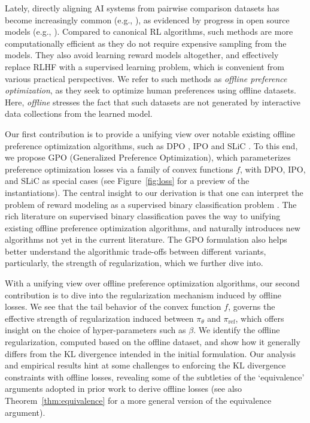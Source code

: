 Lately, directly aligning AI systems from pairwise comparison datasets has become increasingly common (e.g., \citealp{rafailov2023direct,azar2023general,zhao2023SLiC}), as evidenced by progress in open source models (e.g., \citealp{jiang2024mixtral}). Compared to canonical RL algorithms, such methods are more computationally efficient as they do not require expensive sampling from the models. They also avoid learning reward models altogether, and effectively replace RLHF with a supervised learning problem, which is convenient from various practical perspectives. We refer to such methods as \emph{offline preference optimization}, as they seek to optimize human preferences using offline datasets. Here, \emph{offline} stresses the fact that such datasets are not generated by interactive data collections from the learned model.

Our first contribution is to provide a unifying view over notable existing offline preference optimization algorithms, such as DPO \citep{rafailov2023direct}, IPO \citep{azar2023general} and SLiC \citep{zhao2023SLiC}. To this end, we propose GPO (Generalized Preference Optimization),
which parameterizes preference optimization losses via a family of convex functions $f$, with DPO, IPO, and SLiC as special cases (see Figure~\ref{fig:loss} for a preview of the instantiations). The central insight to our derivation is that one can interpret the problem of reward modeling as a supervised binary classification problem \citep{hastie2009elements}. The rich literature on supervised binary classification paves the way to unifying existing offline preference optimization algorithms, and naturally introduces new algorithms not yet in the current literature. The GPO formulation also helps better understand the algorithmic trade-offs between different variants, particularly, the strength of regularization, which we further dive into.

With a unifying view over offline preference optimization algorithms, our second contribution is to dive into the regularization mechanism induced by offline losses. We see that the tail behavior of the convex function $f$, governs the effective strength of regularization induced between $\pi_\theta$ and $\pi_\text{ref}$, which offers insight on the choice of hyper-parameters such as $\beta$. We identify the offline regularization, computed based on the offline dataset, and show how it generally differs from the KL divergence intended in the initial formulation. Our analysis and empirical results hint at some challenges to enforcing the KL divergence constraints with offline losses, revealing some of the subtleties of the `equivalence' arguments adopted in prior work to derive offline losses (see also Theorem~\ref{thm:equivalence} for a more general version of the equivalence argument). 

